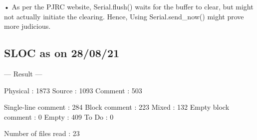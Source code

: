 • As per the P\+J\+RC website, {\ttfamily Serial.\+flush()} waits for the buffer to clear, but might not actually initiate the clearing. Hence, Using {\ttfamily Serial.\+send\+\_\+now()} might prove more judicious.

\subsection*{S\+L\+OC as on 28/08/21}

--- Result --- \begin{DoxyVerb}        Physical :  1873
          Source :  1093
         Comment :  503
\end{DoxyVerb}
 Single-\/line comment \+: 284 Block comment \+: 223 Mixed \+: 132 Empty block comment \+: 0 Empty \+: 409 To Do \+: 0

Number of files read \+: 23 

 